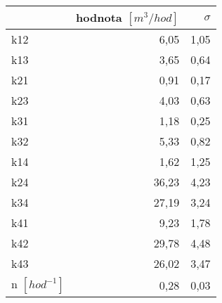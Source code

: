 \begin{tabular}{lrr}
\toprule
{} &  hodnota $\left[\si{m^3/hod}\right]$ &  $\sigma$ \\
\midrule
k12                 &                                 6,05 &      1,05 \\
k13                 &                                 3,65 &      0,64 \\
k21                 &                                 0,91 &      0,17 \\
k23                 &                                 4,03 &      0,63 \\
k31                 &                                 1,18 &      0,25 \\
k32                 &                                 5,33 &      0,82 \\
k14                 &                                 1,62 &      1,25 \\
k24                 &                                36,23 &      4,23 \\
k34                 &                                27,19 &      3,24 \\
k41                 &                                 9,23 &      1,78 \\
k42                 &                                29,78 &      4,48 \\
k43                 &                                26,02 &      3,47 \\
n $[\si{hod^{-1}}]$ &                                 0,28 &      0,03 \\
\bottomrule
\end{tabular}
